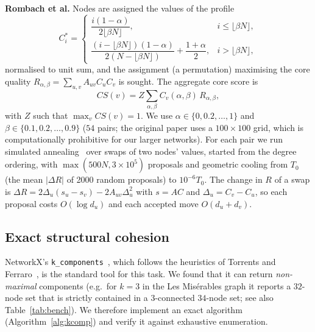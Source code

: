 \documentclass[conference]{IEEEtran}
\begin{document}
\textbf{Rombach et al.} Nodes are assigned the values of the profile~\cite[Eq.~9]{rombach2014core}
\begin{equation}
C^*_i=\begin{cases}\dfrac{i(1-\alpha)}{2\lfloor\beta N\rfloor}, & i\le\lfloor\beta N\rfloor,\\[2mm]
\dfrac{(i-\lfloor\beta N\rfloor)(1-\alpha)}{2(N-\lfloor\beta N\rfloor)}+\dfrac{1+\alpha}{2}, & i>\lfloor\beta N\rfloor,\end{cases}
\end{equation}
normalised to unit sum, and the assignment (a permutation) maximising the core quality
$R_{\alpha,\beta}=\sum_{u,v}A_{uv}C_uC_v$ is sought. The aggregate core score is
\begin{equation}
CS(v)=Z\sum_{\alpha,\beta}C_v(\alpha,\beta)\,R_{\alpha,\beta},
\end{equation}
with $Z$ such that $\max_v CS(v)=1$. We use
$\alpha\in\{0,0.2,\dots,1\}$ and $\beta\in\{0.1,0.2,\dots,0.9\}$ ($54$ pairs; the original paper uses a
$100\times100$ grid, which is computationally prohibitive for our larger networks). For each pair we run
simulated annealing~\cite{kirkpatrick1983optimization} over swaps of two nodes' values, started from the
degree ordering, with $\max(500N,3{\times}10^5)$ proposals and geometric cooling from $T_0$ (the mean
$|\Delta R|$ of 2000 random proposals) to $10^{-6}T_0$. The change in $R$ of a swap is
$\Delta R=2\Delta_u(s_u-s_v)-2A_{uv}\Delta_u^2$ with $s=AC$ and $\Delta_u=C_v-C_u$, so each proposal costs
$O(\log d_u)$ and each accepted move $O(d_u+d_v)$.

\subsection{Exact structural cohesion}
\label{sec:cohesion-alg}
NetworkX's \texttt{k\_components}~\cite{hagberg2008exploring}, which follows the heuristics of Torrents and
Ferraro~\cite{torrents2015structural}, is the standard tool for this task. We found that it can return
\emph{non-maximal} components (e.g.\ for $k=3$ in the Les Mis\'erables graph it reports a $32$-node set that
is strictly contained in a $3$-connected $34$-node set; see also Table~\ref{tab:bench}). We therefore
implement an exact algorithm (Algorithm~\ref{alg:kcomp}) and verify it against exhaustive enumeration.
\end{document}
